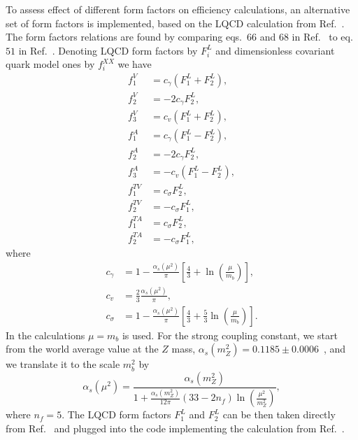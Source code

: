 To assess effect of different form factors on efficiency calculations, an alternative set of form 
factors is implemented, based on the LQCD calculation from Ref.~\cite{Detmold:2012vy}.
The form factors relations are found by comparing eqs.~66 and $68$ in Ref.~\cite{Gutsche:2013pp} to eq.~$51$ in
Ref.~\cite{Detmold:2012vy}. Denoting LQCD form factors by $F_i^L$ and dimensionless covariant quark model ones by
$f_i^{XX}$ we have
\begin{align}
  f_1^V&=c_\gamma(F_1^L+F_2^L), \nonumber \\
  f_2^V&=-2c_\gamma F_2^L, \nonumber \\
  f_3^V&=c_v(F_1^L+F_2^L), \nonumber \\
  f_1^A&=c_\gamma(F_1^L-F_2^L), \nonumber \\
  f_2^A&=-2c_\gamma F_2^L, \nonumber \\
  f_3^A&=-c_v(F_1^L-F_2^L), \nonumber \\
  f_1^{TV}&=c_\sigma F_2^L, \nonumber \\
  f_2^{TV}&=-c_\sigma F_1^L, \nonumber \\
  f_1^{TA}&=c_\sigma F_2^L, \nonumber \\
  f_2^{TA}&=-c_\sigma F_1^L, \nonumber 
\end{align} 
where
\begin{align}
c_\gamma&=1-\frac{\alpha_s(\mu^2)}{\pi}\left[\frac{4}{3}+\ln\left(\frac{\mu}{m_b}\right)\right],\nonumber \\
c_v&=\frac{2}{3}\frac{\alpha_s(\mu^2)}{\pi}, \nonumber \\
c_\sigma&=1-\frac{\alpha_s(\mu^2)}{\pi}\left[\frac{4}{3}+\frac{5}{3}\ln\left(\frac{\mu}{m_b}\right)\right].
\end{align}
In the calculations $\mu=m_b$ is used. For the strong coupling constant, we start from the world average value at
the $Z$ mass, $\alpha_s(m_Z^2)=0.1185 \pm 0.0006$~\cite{PDG2014}, and we translate it to the scale $m_b^2$ by
\begin{equation}
\alpha_s(\mu^2)=\frac{\alpha_s(m_Z^2)}{1+\frac{\alpha_s(m_Z^2)}{12\pi}
\left(33-2n_f\right)\ln\left(\frac{\mu^2}{m_Z^2}\right)},
\end{equation}
where $n_f=5$. The LQCD form factors $F_1^L$ and $F_2^L$ can be then taken directly from Ref.~\cite{Detmold:2012vy} and
plugged into the code implementing the calculation from Ref.~\cite{Gutsche:2013pp}.


